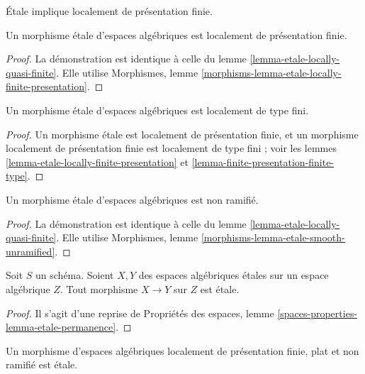 \begin{lemma}
\label{lemma-etale-locally-finite-presentation}
\begin{slogan}
Étale implique localement de présentation finie.
\end{slogan}
Un morphisme étale d'espaces algébriques est localement de présentation finie.
\end{lemma}

\begin{proof}
La démonstration est identique à celle du
lemme \ref{lemma-etale-locally-quasi-finite}.
Elle utilise
Morphismes, lemme \ref{morphisms-lemma-etale-locally-finite-presentation}.
\end{proof}

\begin{lemma}
\label{lemma-etale-locally-finite-type}
Un morphisme étale d'espaces algébriques est localement de type fini.
\end{lemma}

\begin{proof}
Un morphisme étale est localement de présentation finie,
et un morphisme localement de présentation finie est localement de type fini ;
voir les
lemmes \ref{lemma-etale-locally-finite-presentation} et
\ref{lemma-finite-presentation-finite-type}.
\end{proof}

\begin{lemma}
\label{lemma-etale-unramified}
Un morphisme étale d'espaces algébriques est non ramifié.
\end{lemma}

\begin{proof}
La démonstration est identique à celle du
lemme \ref{lemma-etale-locally-quasi-finite}.
Elle utilise
Morphismes, lemme \ref{morphisms-lemma-etale-smooth-unramified}.
\end{proof}

\begin{lemma}
\label{lemma-etale-permanence}
Soit $S$ un schéma. Soient $X, Y$ des espaces algébriques étales sur
un espace algébrique $Z$. Tout morphisme $X \to Y$ sur $Z$ est étale.
\end{lemma}

\begin{proof}
Il s'agit d'une reprise de
Propriétés des espaces, lemme \ref{spaces-properties-lemma-etale-permanence}.
\end{proof}

\begin{lemma}
\label{lemma-unramified-flat-lfp-etale}
Un morphisme d'espaces algébriques localement de présentation finie,
plat et non ramifié est étale.
\end{lemma}

